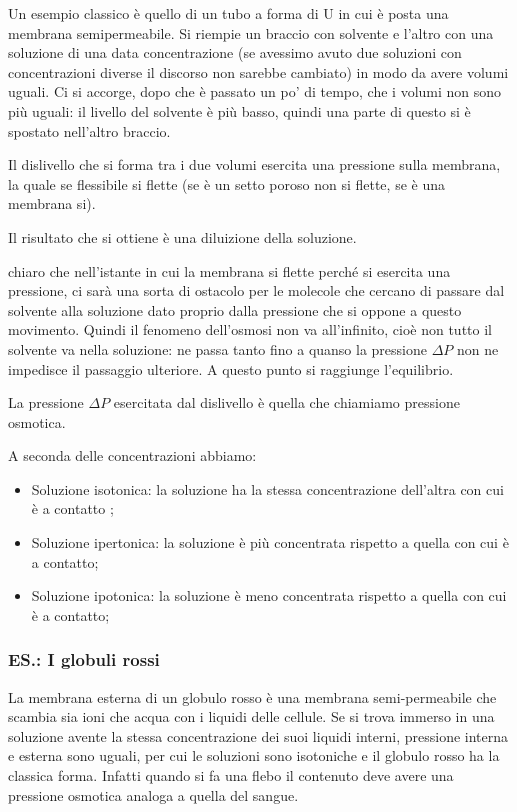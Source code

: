 Un esempio classico è quello di un tubo a forma di U in cui è posta una membrana semipermeabile. Si riempie un braccio con solvente e l'altro con una soluzione di una data concentrazione (se avessimo avuto due soluzioni con concentrazioni diverse il discorso non sarebbe cambiato) in modo da avere volumi uguali. Ci si accorge, dopo che è passato un po' di tempo, che i volumi non sono più uguali: il livello del solvente è più basso, quindi una parte di questo si è spostato nell'altro braccio.

Il dislivello che si forma tra i due volumi esercita una pressione sulla membrana, la quale se flessibile si flette (se è un setto poroso non si flette, se è una membrana si).

Il risultato che si ottiene è una diluizione della soluzione.

\E chiaro che nell'istante in cui la membrana si flette perché si esercita una pressione, ci sarà una sorta di ostacolo per le molecole che cercano di passare dal solvente alla soluzione dato proprio dalla pressione che si oppone a questo movimento. Quindi il fenomeno dell'osmosi non va all'infinito, cioè non tutto il solvente va nella soluzione: ne passa tanto fino a quanso la pressione $\Delta P$ non ne impedisce il passaggio ulteriore. A questo punto si raggiunge l'equilibrio.

La pressione $\Delta P$ esercitata dal dislivello è quella che chiamiamo pressione osmotica.

A seconda delle concentrazioni abbiamo:

\begin{itemize}
    \item Soluzione isotonica: la soluzione ha la stessa concentrazione dell'altra con cui è a contatto ;
    \item Soluzione ipertonica: la soluzione è più concentrata rispetto a quella con cui è a contatto;
    \item Soluzione ipotonica: la soluzione è meno concentrata rispetto a quella con cui è a contatto;
\end{itemize}

\subsubsection{ES.: I globuli rossi}
La membrana esterna di un globulo rosso è una membrana semi-permeabile che scambia sia ioni che acqua con i liquidi delle cellule. Se si trova immerso in una soluzione avente la stessa concentrazione dei suoi liquidi interni, pressione interna e esterna sono uguali, per cui le soluzioni sono isotoniche e il globulo rosso ha la classica forma. Infatti quando si fa una flebo il contenuto deve avere una pressione osmotica analoga a quella del sangue.

